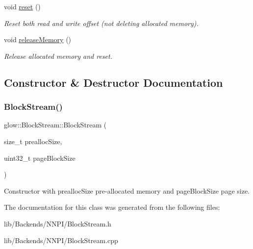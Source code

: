 \begin{DoxyCompactItemize}
void \hyperlink{classglow_1_1_block_stream_a2e7d260c31548fec456369ada8772f96}{reset} ()
\begin{DoxyCompactList}\small\item\em Reset both read and write offset (not deleting allocated memory). \end{DoxyCompactList}\item 
\mbox{\label{classglow_1_1_block_stream_a9df3e1185786a9647279627b42526ac6}} 
void \hyperlink{classglow_1_1_block_stream_a9df3e1185786a9647279627b42526ac6}{release\+Memory} ()
\begin{DoxyCompactList}\small\item\em Release allocated memory and reset. \end{DoxyCompactList}\end{DoxyCompactItemize}


\subsection{Constructor \& Destructor Documentation}
\mbox{\label{classglow_1_1_block_stream_a2477bdde2366295d7a27087a011b824b}} 
\subsubsection{\texorpdfstring{Block\+Stream()}{BlockStream()}}
{\footnotesize\ttfamily glow\+::\+Block\+Stream\+::\+Block\+Stream (\begin{DoxyParamCaption}\item[{size\+\_\+t}]{prealloc\+Size,  }\item[{uint32\+\_\+t}]{page\+Block\+Size }\end{DoxyParamCaption})}

Constructor with prealloc\+Size pre-\/allocated memory and page\+Block\+Size page size. 

The documentation for this class was generated from the following files\+:\begin{DoxyCompactItemize}
\item 
lib/\+Backends/\+N\+N\+P\+I/Block\+Stream.\+h\item 
lib/\+Backends/\+N\+N\+P\+I/Block\+Stream.\+cpp\end{DoxyCompactItemize}
